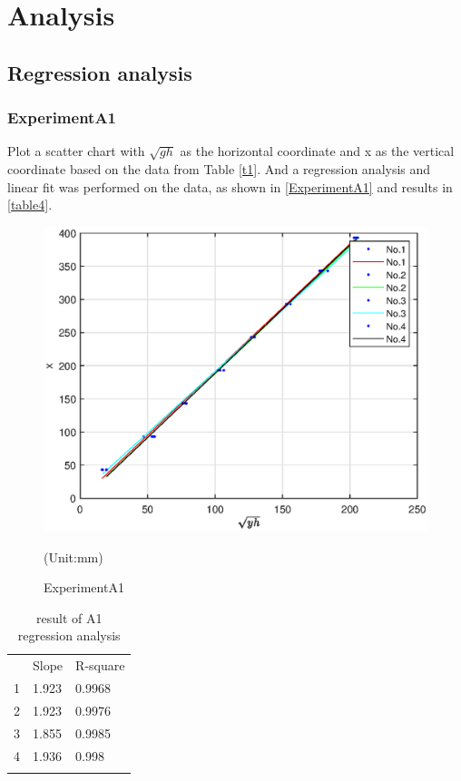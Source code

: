 \section{Analysis}
\label{sec:analysis}
\subsection{Regression analysis}
\subsubsection{ExperimentA1}
Plot a scatter chart with $\sqrt{gh}$ as the horizontal coordinate 
and x as the vertical coordinate based on the data from Table \ref{t1}.
And a regression analysis and linear fit was performed on the data, 
as shown in \autoref{ExperimentA1} and results in \autoref{table4}.





\begin{figure}[h]
    \centering
    \includegraphics[width=0.75\linewidth]{Results/1.eps}
    \caption{ExperimentA1}
    \label{ExperimentA1}
    (Unit:mm)
\end{figure}

\begin{table}[h]
    \centering
    \begin{tabular}{l|ll} 
        \cline{1-3}
                             & Slope & R-square     \\ 
        \cline{1-3}
        1                    & 1.923 & 0.9968       \\
        2                    & 1.923 & 0.9976       \\
        3                    & 1.855 & 0.9985       \\
        4                    & 1.936 & 0.998        \\ 
        \cline{1-3}
        \multicolumn{1}{l}{} &       &             
        \end{tabular}
        \caption{result of A1 regression analysis}
        \label{table4}
\end{table}

